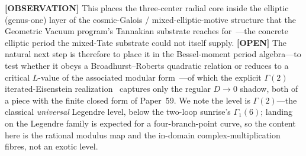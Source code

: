 \documentclass[aps,pra,twocolumn,superscriptaddress,longbibliography]{revtex4-2}
\begin{document}
\textbf{[OBSERVATION]} This places the three-center radial core inside the
elliptic (genus-one) layer of the cosmic-Galois / mixed-elliptic-motive structure
that the Geometric Vacuum program's Tannakian substrate reaches
for~\cite{brown_cosmic2017,loutey_paper56}---the concrete elliptic period the
mixed-Tate substrate could not itself supply.  \textbf{[OPEN]} The natural next step is therefore to place it in the
Bessel-moment period algebra---to test whether it obeys a Broadhurst--Roberts
quadratic relation or reduces to a critical $L$-value of the associated modular
form~\cite{fresansabbahyu2023,zhou_quadratic2021}---of which the
explicit $\Gamma(2)$ iterated-Eisenstein
realization~\cite{broedel_eisenstein2018,manin2006} captures only the regular
$D\to0$ shadow, both of a piece with the finite closed form of
Paper~59.  We note the level is
$\Gamma(2)$---the classical \emph{universal} Legendre level, below the two-loop
sunrise's $\Gamma_{1}(6)$; landing on the Legendre family is expected for a
four-branch-point curve, so the content here is the rational modulus map and the
in-domain complex-multiplication fibres, not an exotic level.
\end{document}
